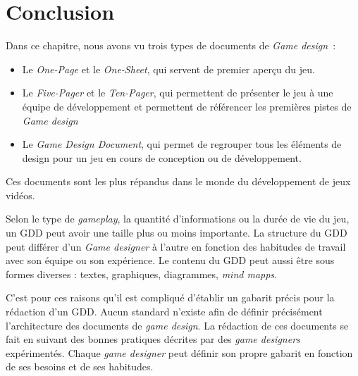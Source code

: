 


\section{Conclusion}
Dans ce chapitre, nous avons vu trois types de documents de \emph{Game design}~: 
\begin{itemize}
    \item Le \emph{One-Page} et le \emph{One-Sheet}, qui servent de premier aperçu du jeu.
    \item Le \emph{Five-Pager} et le \emph{Ten-Pager}, qui permettent de présenter le jeu à une équipe de développement et permettent de référencer les premières pistes de \emph{Game design}
    \item Le \emph{Game Design Document}, qui permet de regrouper tous les éléments de design pour un jeu en cours de conception ou de développement.
\end{itemize}



%  
Ces documents sont les plus répandus dans le monde du développement de jeux vidéos. 

Selon le type de \emph{gameplay}, la quantité d'informations ou la durée de vie du jeu, un GDD peut avoir une taille plus ou moins importante. 
%
La structure du GDD peut différer d'un \emph{Game designer} à l'autre en fonction des habitudes de travail avec son équipe ou son expérience.
Le contenu du GDD peut aussi être sous formes diverses :  textes,  graphiques, diagrammes,  \emph{mind mapps}. 



C'est pour ces raisons qu'il est compliqué d'établir un gabarit précis pour la rédaction d'un GDD.
Aucun standard n'existe afin de définir précisément l'architecture des documents de \emph{game design}.
La rédaction de ces documents se fait en suivant des bonnes pratiques décrites par des \emph{game designers} expérimentés.
Chaque \emph{game designer} peut définir son propre gabarit en fonction de ses besoins et de ses habitudes.

